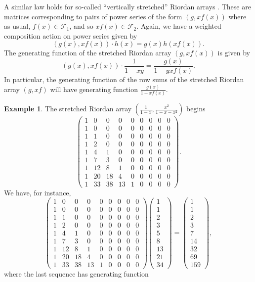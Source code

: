 \documentclass[12pt,reqno]{article}
\theoremstyle{definition}
\newtheorem{example}[theorem]{Example}
\begin{document}
A similar law holds for so-called ``vertically stretched'' Riordan arrays \cite{LI}. These are matrices corresponding to pairs of power series of the form $(g, xf(x))$ where as usual, $f(x) \in \mathcal{F}_1$, and so $xf(x) \in \mathcal{F}_2$. Again, we have a weighted composition action on power series given by
$$ (g(x), xf(x))\cdot h(x)= g(x)h(xf(x)).$$
The generating function of the stretched Riordan array $(g, xf(x))$  is given by
$$(g(x),xf(x))\cdot \frac{1}{1-xy}=\frac{g(x)}{1-yxf(x)}.$$ In particular, the generating function of the row sums of the stretched Riordan array $(g,xf)$ will have generating function $\frac{g(x)}{1-xf(x)}$.
\begin{example} The stretched Riordan array $\left(\frac{1}{1-x}, \frac{x^2}{1-x-x^2}\right)$ begins
$$\left(\begin{array}{ccccccccc}
1 & 0 & 0 & 0 & 0 & 0 & 0 & 0 & 0 \\
1 & 0 & 0 & 0 & 0 & 0 & 0 & 0 & 0 \\
1 & 1 & 0 & 0 & 0 & 0 & 0 & 0 & 0 \\
1 & 2 & 0 & 0 & 0 & 0 & 0 & 0 & 0 \\
1 & 4 & 1 & 0 & 0 & 0 & 0 & 0 & 0 \\
1 & 7 & 3 & 0 & 0 & 0 & 0 & 0 & 0 \\
1 & 12 & 8 & 1 & 0 & 0 & 0 & 0 & 0 \\
1 & 20 & 18 & 4 & 0 & 0 & 0 & 0 & 0 \\
1 & 33 & 38 & 13 & 1 & 0 & 0 & 0 & 0
\end{array}\right).$$ We have, for instance,
$$\left(\begin{array}{ccccccccc}
1 & 0 & 0 & 0 & 0 & 0 & 0 & 0 & 0 \\
1 & 0 & 0 & 0 & 0 & 0 & 0 & 0 & 0 \\
1 & 1 & 0 & 0 & 0 & 0 & 0 & 0 & 0 \\
1 & 2 & 0 & 0 & 0 & 0 & 0 & 0 & 0 \\
1 & 4 & 1 & 0 & 0 & 0 & 0 & 0 & 0 \\
1 & 7 & 3 & 0 & 0 & 0 & 0 & 0 & 0 \\
1 & 12 & 8 & 1 & 0 & 0 & 0 & 0 & 0 \\
1 & 20 & 18 & 4 & 0 & 0 & 0 & 0 & 0 \\
1 & 33 & 38 & 13 & 1 & 0 & 0 & 0 & 0
\end{array}\right)\left( \begin{array}{c}1\\1\\2\\3\\5\\8\\13\\21\\34\end{array}\right)=\left( \begin{array}{c}1\\1\\2\\3\\7\\14\\32\\69\\159\end{array}\right),$$ where the last sequence has generating function

\end{example}
\end{document}
